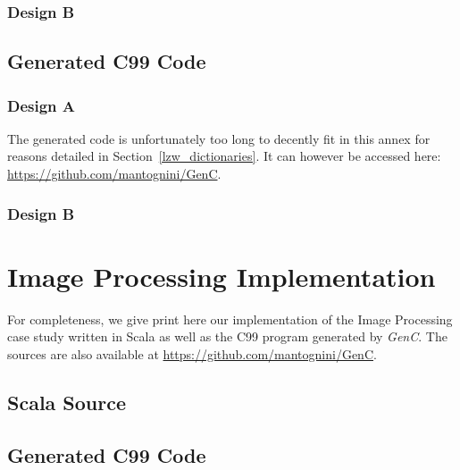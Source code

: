 \documentclass[a4paper,twoside]{article}
\let\oldsection\section
\renewcommand\section{\cleardoublepage\oldsection}
\newcommand{\GenC}{\emph{GenC}\xspace}
\newcommand{\RefSec}[1]{Section~\ref{#1}}
\begin{document}
\begin{landscape}
\clearpage
\subsubsection*{Design B}
\label{lzw_impl_scala_b}


\clearpage
\subsection{Generated C99 Code}

\subsubsection*{Design A}
\label{lzw_impl_c_b}

The generated code is unfortunately too long to decently fit in this annex for
reasons detailed in \RefSec{lzw_dictionaries}. It can however be accessed here:
\url{https://github.com/mantognini/GenC}.

\subsubsection*{Design B}
\label{lzw_impl_c_b}


\section{Image Processing Implementation}

For completeness, we give print here our implementation of the Image Processing
case study written in Scala as well as the C99 program generated by \GenC. The
sources are also available at \url{https://github.com/mantognini/GenC}.

\subsection{Scala Source}
\label{img_proc_scala}


\clearpage
\subsection{Generated C99 Code}
\label{img_proc_c}


\end{landscape}

\clearpage



\end{document}

